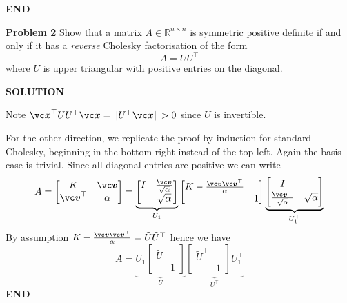 \documentclass[12pt,a4paper]{article}
\def\bbR{ {\mathbb R} }
\def\x{ {\vc x} }
\def\v{ {\vc v} }
\def\Ut{ {\tilde U} }
\begin{document}
\textbf{END}

\textbf{Problem 2} Show that a matrix $A \ensuremath{\in} \ensuremath{\bbR}^{n \ensuremath{\times} n}$ is symmetric positive definite if and only if it has a \emph{reverse} Cholesky factorisation of the form
\[
A = U U^\ensuremath{\top}
\]
where $U$ is upper triangular with positive entries on the diagonal.

\textbf{SOLUTION}

Note $\ensuremath{\bm{\x}}^\ensuremath{\top} U U^\ensuremath{\top} \ensuremath{\bm{\x}} = \| U^\ensuremath{\top} \ensuremath{\bm{\x}} \| > 0$ since $U$ is invertible.

For the other direction, we replicate the proof by induction for standard Cholesky, beginning in the bottom right instead of the top left. Again the basis case is trivial. Since all diagonal entries are positive we can write
\[
A = \begin{bmatrix} K & \ensuremath{\bm{\v}}\\
                    \ensuremath{\bm{\v}}^\ensuremath{\top} & \ensuremath{\alpha} \end{bmatrix} =
                    \underbrace{\begin{bmatrix} I & {\ensuremath{\bm{\v}} \over \sqrt{\ensuremath{\alpha}}} \\
                                        & \sqrt{\ensuremath{\alpha}}
                                        \end{bmatrix}}_{U_1}
                    \begin{bmatrix} K - {\ensuremath{\bm{\v}} \ensuremath{\bm{\v}}^\ensuremath{\top} \over \ensuremath{\alpha}}  & \\
                     & 1 \end{bmatrix}
                     \underbrace{\begin{bmatrix} I \\
                      {\ensuremath{\bm{\v}}^\ensuremath{\top} \over \sqrt{\ensuremath{\alpha}}} & \sqrt{\ensuremath{\alpha}}
                                        \end{bmatrix}}_{U_1^\ensuremath{\top}}
\]
By assumption $K - {\ensuremath{\bm{\v}} \ensuremath{\bm{\v}}^\ensuremath{\top} \over \ensuremath{\alpha}} = \Ut\Ut^\ensuremath{\top}$ hence we have
\[
A = \underbrace{U_1 \begin{bmatrix} \Ut \\ & 1 \end{bmatrix}}_U  \underbrace{\begin{bmatrix} \Ut^\top \\ & 1 \end{bmatrix} U_1^\top}_{U^\top}
\]
\textbf{END}
\end{document}
